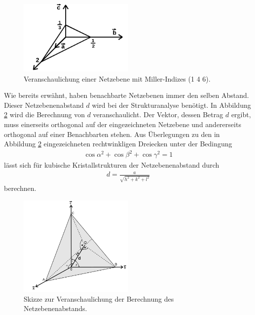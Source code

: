 \begin{figure}[hhh]
\centering
\includegraphics[width=0.5\textwidth]{abbildungen/miller_ind.png}
\caption{Veranschaulichung einer Netzebene mit Miller-Indizes (1 4 6).\cite{sample}}
\label{fig:miller_ind}
\end{figure}

Wie bereits erwähnt, haben benachbarte Netzebenen immer
den selben Abstand. Dieser Netzebenenabstand $d$ wird bei der
Strukturanalyse benötigt. In Abbildung \ref{fig:miller_abstand} wird
die Berechnung von $d$ veranschaulicht. Der Vektor, dessen Betrag $d$ ergibt,
muss einerseits orthogonal auf der eingezeichneten Netzebene und andererseits orthogonal
auf einer Benachbarten stehen. Aus Überlegungen zu den in Abbildung \ref{fig:miller_abstand}
eingezeichneten rechtwinkligen Dreiecken unter der Bedingung
\begin{align}
\label{eqn:4}
\cos\alpha^2 + \cos\beta^2 + \cos\gamma^2 = 1
\end{align}
lässt sich für kubische Kristallstrukturen der Netzebenenabstand
durch
\begin{align}
\label{eqn:5}
d = \frac{a}{\sqrt{h^2 + k^2 + l^2}}
\end{align}
berechnen.

\begin{figure}[hhh]
\centering
\includegraphics[width=0.5\textwidth]{abbildungen/miller_dist.png}
\caption{Skizze zur Veranschaulichung der Berechnung des Netzebenenabstands.\cite{sample}}
\label{fig:miller_abstand}
\end{figure}

